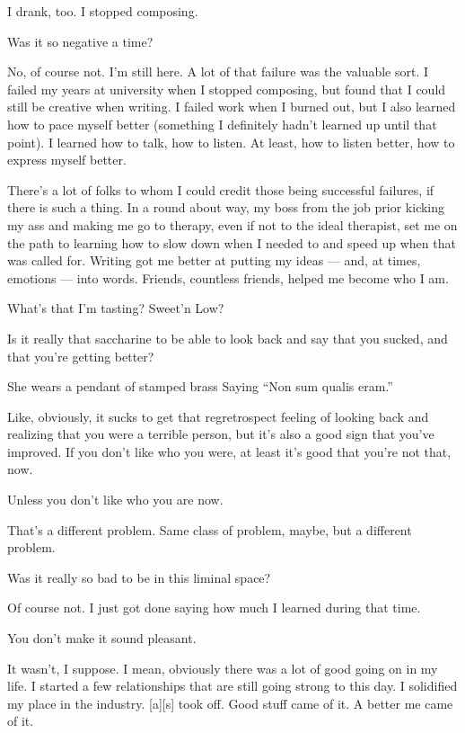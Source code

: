 \begin{paracol}{2}
\begin{leftcolumn}
I drank, too. I stopped composing.

\begin{ally}
Was it so negative a time?
\end{ally}
No, of course not. I'm still here. A lot of that failure was the valuable sort. I failed my years at university when I stopped composing, but found that I could still be creative when writing. I failed work when I burned out, but I also learned how to pace myself better (something I definitely hadn't learned up until that point). I learned how to talk, how to listen. At least, how to listen better, how to express myself better.

There's a lot of folks to whom I could credit those being successful failures, if there is such a thing. In a round about way, my boss from the job prior kicking my ass and making me go to therapy, even if not to the ideal therapist, set me on the path to learning how to slow down when I needed to and speed up when that was called for. Writing got me better at putting my ideas --- and, at times, emotions --- into words. Friends, countless friends, helped me become who I am.

\begin{ally}
What's that I'm tasting? Sweet'n Low?
\end{ally}
Is it really that saccharine to be able to look back and say that you sucked, and that you're getting better?

She wears a pendant of stamped brass Saying ``Non sum qualis eram.''

Like, obviously, it sucks to get that regretrospect feeling of looking back and realizing that you were a terrible person, but it's also a good sign that you've improved. If you don't like who you were, at least it's good that you're not that, now.

\begin{ally}
Unless you don't like who you are now.
\end{ally}
That's a different problem. Same class of problem, maybe, but a different problem.
\newpage

\begin{ally}
Was it really so bad to be in this liminal space?
\end{ally}
Of course not. I just got done saying how much I learned during that time.

\begin{ally}
You don't make it sound pleasant.
\end{ally}
It wasn't, I suppose. I mean, obviously there was a lot of good going on in my life. I started a few relationships that are still going strong to this day. I solidified my place in the industry. {[}a{]}{[}s{]} took off. Good stuff came of it. A better me came of it.


\end{leftcolumn}
\end{paracol}
